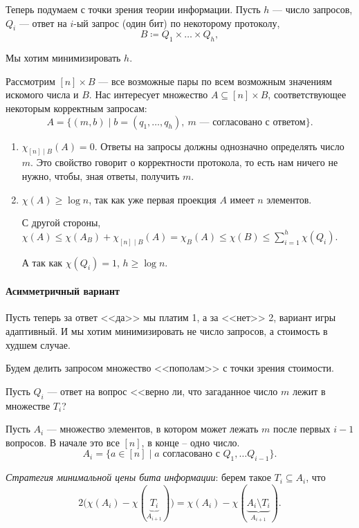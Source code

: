 Теперь подумаем с точки зрения теории информации.
Пусть $ h$ --- число запросов, $ Q_i$ --- ответ на $ i$-ый запрос (один бит) по некоторому протоколу, 
$$ B \coloneqq Q_1 \times \ldots \times Q_h,$$ 

Мы хотим минимизировать $ h$.

Рассмотрим $ [n]\times B$ --- все возможные пары по всем возможным значениям искомого числа и $ B$. 
Нас интересует множество  $ A \subseteq [n]\times B$, соответствующее некоторым корректным запросам:
\[
	A = \{(m, b) \mid b = (q_1, \ldots , q_h), ~ m \text{ --- согласовано с ответом}\}
.\] 

\begin{enumerate}
	\item $ \chi _{[n] \mid B}(A) = 0$. Ответы на запросы должны однозначно определять число $ m$. Это свойство говорит о корректности протокола, то есть нам ничего не нужно, чтобы, зная ответы, получить $ m$.
	\item $ \chi(A) \ge \log n$, так как уже первая проекция $A$ имеет $n$ элементов. 

		С другой стороны, $ \chi(A) \le \chi(A_{B}) + \chi_{[n] \mid B}(A) = \chi_{B}(A) \le \chi(B) \le \sum_{i=1}^{h} \chi(Q_i)$. 

		А так как $ \chi(Q_i) = 1$, $  h \ge \log n $.
\end{enumerate} 

\paragraph{Асимметричный вариант}
Пусть теперь за ответ <<да>> мы платим 1, а за <<нет>> 2, вариант игры адаптивный. И мы хотим минимизировать не число запросов, а стоимость в худшем случае.

Будем делить запросом множество <<пополам>> с точки зрения стоимости.

Пусть $ Q_i $ --- ответ на вопрос <<верно ли, что загаданное число $ m$ лежит в множестве $ T_i$?

Пусть $ A_i$ --- множество элементов, в котором может лежать $ m$ после первых  $ i - 1$ вопросов. В начале это все $ [n]$, в конце -- одно число.
\[
	A_i = \{a \in [n] \mid a \text{ согласовано с } Q_1, \ldots Q_{i-1}\}
.\] 

\textit{Стратегия минимальной цены бита информации}: берем такое $ T_i \subseteq A_i$, что
 \[
	 2\bigl(\chi(A_i) - \chi(\underbrace{T_i}_{A_{i+1}})\bigr) = \chi(A_i) - \chi(\underbrace{A_i \setminus T_i}_{A_{i+1}})
.\] 

